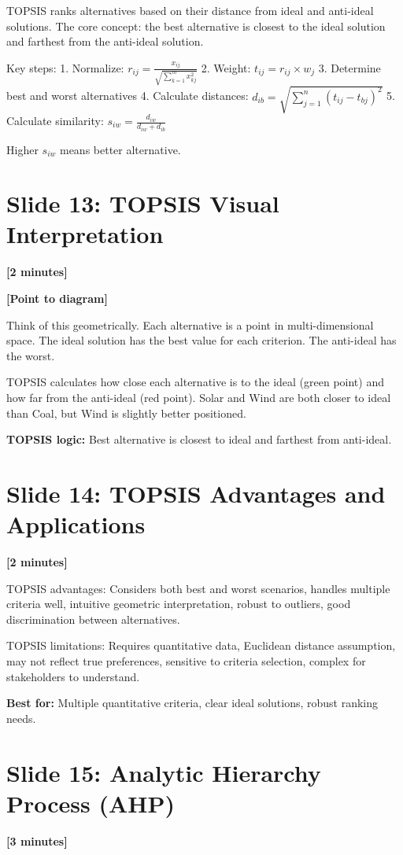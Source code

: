 \documentclass[12pt]{article}
\begin{document}
TOPSIS ranks alternatives based on their distance from ideal and anti-ideal solutions. The core concept: the best alternative is closest to the ideal solution and farthest from the anti-ideal solution.

Key steps:
1. Normalize: $r_{ij} = \frac{x_{ij}}{\sqrt{\sum_{k=1}^{m} x_{kj}^2}}$
2. Weight: $t_{ij} = r_{ij} \times w_j$  
3. Determine best and worst alternatives
4. Calculate distances: $d_{ib} = \sqrt{\sum_{j=1}^{n} (t_{ij} - t_{bj})^2}$
5. Calculate similarity: $s_{iw} = \frac{d_{iw}}{d_{iw} + d_{ib}}$

Higher $s_{iw}$ means better alternative.

\section*{Slide 13: TOPSIS Visual Interpretation}
\textcolor{timing}{\textbf{[2 minutes]}}

\textcolor{speakernote}{\textbf{[Point to diagram]}}

Think of this geometrically. Each alternative is a point in multi-dimensional space. The ideal solution has the best value for each criterion. The anti-ideal has the worst.

TOPSIS calculates how close each alternative is to the ideal (green point) and how far from the anti-ideal (red point). Solar and Wind are both closer to ideal than Coal, but Wind is slightly better positioned.

\textcolor{emphasis}{\textbf{TOPSIS logic:}} Best alternative is closest to ideal and farthest from anti-ideal.

\section*{Slide 14: TOPSIS Advantages and Applications}
\textcolor{timing}{\textbf{[2 minutes]}}

TOPSIS advantages: Considers both best and worst scenarios, handles multiple criteria well, intuitive geometric interpretation, robust to outliers, good discrimination between alternatives.

TOPSIS limitations: Requires quantitative data, Euclidean distance assumption, may not reflect true preferences, sensitive to criteria selection, complex for stakeholders to understand.

\textcolor{emphasis}{\textbf{Best for:}} Multiple quantitative criteria, clear ideal solutions, robust ranking needs.

\section*{Slide 15: Analytic Hierarchy Process (AHP)}
\textcolor{timing}{\textbf{[3 minutes]}}
\end{document}
